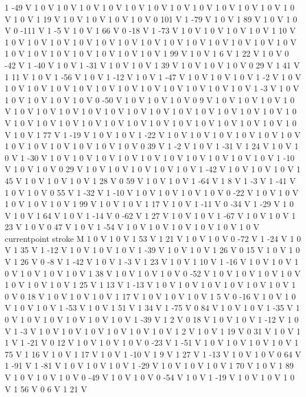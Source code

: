 {{1 -49 V
1 0 V
1 0 V
1 0 V
1 0 V
1 0 V
1 0 V
1 0 V
1 0 V
1 0 V
1 0 V
1 0 V
1 0 V
1 0 V
1 19 V
1 0 V
1 0 V
1 0 V
1 0 V
0 101 V
1 -79 V
1 0 V
1 89 V
1 0 V
1 0 V
0 -111 V
1 -5 V
1 0 V
1 66 V
0 -18 V
1 -73 V
1 0 V
1 0 V
1 0 V
1 0 V
1 10 V
1 0 V
1 0 V
1 0 V
1 0 V
1 0 V
1 0 V
1 0 V
1 0 V
1 0 V
1 0 V
1 0 V
1 0 V
1 0 V
1 0 V
1 0 V
1 0 V
1 0 V
1 0 V
1 0 V
1 0 V
1 99 V
1 0 V
1 6 V
1 22 V
1 0 V
0 -42 V
1 -40 V
1 0 V
1 -31 V
1 0 V
1 0 V
1 39 V
1 0 V
1 0 V
1 0 V
0 29 V
1 41 V
1 11 V
1 0 V
1 -56 V
1 0 V
1 -12 V
1 0 V
1 -47 V
1 0 V
1 0 V
1 0 V
1 -2 V
1 0 V
1 0 V
1 0 V
1 0 V
1 0 V
1 0 V
1 0 V
1 0 V
1 0 V
1 0 V
1 0 V
1 0 V
1 -3 V
1 0 V
1 0 V
1 0 V
1 0 V
1 0 V
0 -50 V
1 0 V
1 0 V
1 0 V
0 9 V
1 0 V
1 0 V
1 0 V
1 0 V
1 0 V
1 0 V
1 0 V
1 0 V
1 0 V
1 0 V
1 0 V
1 0 V
1 0 V
1 0 V
1 0 V
1 0 V
1 0 V
1 0 V
1 0 V
1 0 V
1 0 V
1 0 V
1 0 V
1 0 V
1 0 V
1 0 V
1 0 V
1 0 V
1 0 V
1 0 V
1 0 V
1 77 V
1 -19 V
1 0 V
1 0 V
1 -22 V
1 0 V
1 0 V
1 0 V
1 0 V
1 0 V
1 0 V
1 0 V
1 0 V
1 0 V
1 0 V
1 0 V
1 0 V
0 39 V
1 -2 V
1 0 V
1 -31 V
1 24 V
1 0 V
1 0 V
1 -30 V
1 0 V
1 0 V
1 0 V
1 0 V
1 0 V
1 0 V
1 0 V
1 0 V
1 0 V
1 0 V
1 -10 V
1 0 V
1 0 V
0 29 V
1 0 V
1 0 V
1 0 V
1 0 V
1 0 V
1 -42 V
1 0 V
1 0 V
1 0 V
1 45 V
1 0 V
1 0 V
1 0 V
1 28 V
0 59 V
1 0 V
1 0 V
1 -64 V
1 8 V
1 -3 V
1 -41 V
1 0 V
1 0 V
0 55 V
1 -32 V
1 -10 V
1 0 V
1 0 V
1 0 V
1 0 V
0 -22 V
1 0 V
1 0 V
1 0 V
1 0 V
1 0 V
1 99 V
1 0 V
1 0 V
1 17 V
1 0 V
1 -11 V
0 -34 V
1 -29 V
1 0 V
1 0 V
1 64 V
1 0 V
1 -14 V
0 -62 V
1 27 V
1 0 V
1 0 V
1 -67 V
1 0 V
1 0 V
1 23 V
1 0 V
0 47 V
1 0 V
1 -54 V
1 0 V
1 0 V
1 0 V
1 0 V
1 0 V
1 0 V
currentpoint stroke M
1 0 V
1 0 V
1 53 V
1 21 V
1 0 V
1 0 V
0 -72 V
1 -24 V
1 0 V
1 35 V
1 -12 V
1 0 V
1 0 V
1 0 V
1 -39 V
1 0 V
1 0 V
1 26 V
0 15 V
1 0 V
1 0 V
1 26 V
0 -8 V
1 -42 V
1 0 V
1 -3 V
1 23 V
1 0 V
1 10 V
1 -16 V
1 0 V
1 0 V
1 0 V
1 0 V
1 0 V
1 0 V
1 38 V
1 0 V
1 0 V
1 0 V
0 -52 V
1 0 V
1 0 V
1 0 V
1 0 V
1 0 V
1 0 V
1 0 V
1 25 V
1 13 V
1 -13 V
1 0 V
1 0 V
1 0 V
1 0 V
1 0 V
1 0 V
1 0 V
0 18 V
1 0 V
1 0 V
1 0 V
1 17 V
1 0 V
1 0 V
1 0 V
1 5 V
0 -16 V
1 0 V
1 0 V
1 0 V
1 0 V
1 -53 V
1 0 V
1 51 V
1 34 V
1 -75 V
0 84 V
1 0 V
1 0 V
1 -35 V
1 0 V
1 0 V
1 0 V
1 0 V
1 0 V
1 0 V
1 -39 V
1 2 V
0 18 V
1 0 V
1 0 V
1 -12 V
1 0 V
1 -3 V
1 0 V
1 0 V
1 0 V
1 0 V
1 0 V
1 0 V
1 2 V
1 0 V
1 19 V
0 31 V
1 0 V
1 1 V
1 -21 V
0 12 V
1 0 V
1 0 V
1 0 V
0 -23 V
1 -51 V
1 0 V
1 0 V
1 0 V
1 0 V
1 75 V
1 16 V
1 0 V
1 17 V
1 0 V
1 -10 V
1 9 V
1 27 V
1 -13 V
1 0 V
1 0 V
0 64 V
1 -91 V
1 -81 V
1 0 V
1 0 V
1 0 V
1 -29 V
1 0 V
1 0 V
1 0 V
1 70 V
1 0 V
1 89 V
1 0 V
1 0 V
1 0 V
0 -49 V
1 0 V
1 0 V
0 -54 V
1 0 V
1 -19 V
1 0 V
1 0 V
1 0 V
1 56 V
0 6 V
1 21 V
}}
